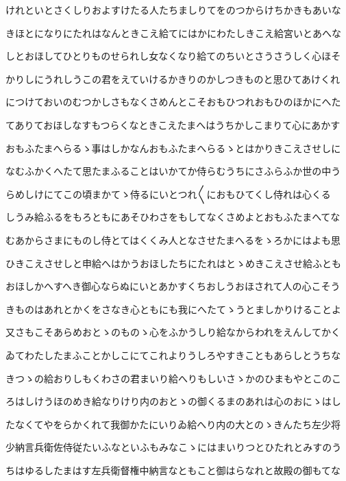 \documentclass[a4paper,11pt,landscape]{ltjtarticle}
\begin{document}
けれといとさくしりおよすけたる人たちましりてをのつからけちかきもあいな
\par\medskip
きほとになりにたれはなんときこえ給てにはかにわたしきこえ給宮いとあへな
\par\medskip
しとおほしてひとりものせられし女なくなり給てのちいとさうさうしく心ほそ
\par\medskip
かりしにうれしうこの君をえていけるかきりのかしつきものと思ひてあけくれ
\par\medskip
につけておいのむつかしさもなくさめんとこそおもひつれおもひのほかにへた
\par\medskip
てありておほしなすもつらくなときこえたまへはうちかしこまりて心にあかす
\par\medskip
おもふたまへらるゝ事はしかなんおもふたまへらるゝとはかりきこえさせしに
\par\medskip
なむふかくへたて思たまふることはいかてか侍らむうちにさふらふか世の中う
\par\medskip
らめしけにてこの頃まかてゝ侍るにいとつれ〱におもひてくし侍れは心くる
\par\medskip
しうみ給ふるをもろともにあそひわさをもしてなくさめよとおもふたまへてな
\par\medskip
むあからさまにものし侍とてはくくみ人となさせたまへるをゝろかにはよも思
\par\medskip
ひきこえさせしと申給へはかうおほしたちにたれはとゝめきこえさせ給ふとも
\par\medskip
おほしかへすへき御心ならぬにいとあかすくちおしうおほされて人の心こそう
\par\medskip
きものはあれとかくをさなき心ともにも我にへたてゝうとましかりけることよ
\par\medskip
又さもこそあらめおとゝのものゝ心をふかうしり給なからわれをえんしてかく
\par\medskip
ゐてわたしたまふことかしこにてこれよりうしろやすきこともあらしとうちな
\par\medskip
きつゝの給おりしもくわさの君まいり給へりもしいさゝかのひまもやとこのこ
\par\medskip
ろはしけうほのめき給なりけり内のおとゝの御くるまのあれは心のおにゝはし
\par\medskip
たなくてやをらかくれて我御かたにいりゐ給へり内の大とのゝきんたち左少将
\par\medskip
少納言兵衛佐侍従たいふなといふもみなこゝにはまいりつとひたれとみすのう
\par\medskip
ちはゆるしたまはす左兵衛督権中納言なともこと御はらなれと故殿の御もてな
\par\medskip
\end{document}
